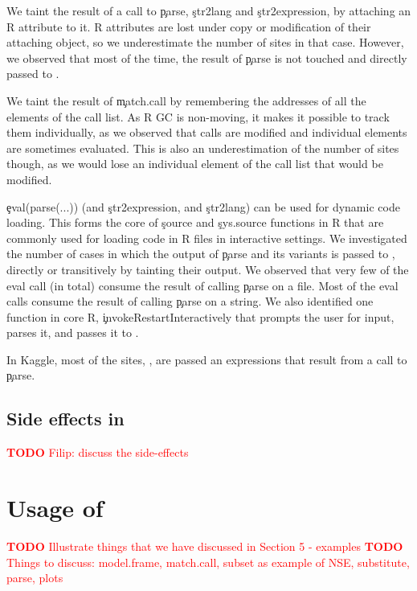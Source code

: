 \documentclass[screen,acmsmall]{acmart}
\newcommand{\authorcomment}[3]{\xspace\textcolor{#1}{{\bf #2} #3}\xspace}
\newcommand{\todo}[1]{\authorcomment{red}{TODO}{#1}}
\begin{document}
We taint the result of a call to \c{parse}, \c{str2lang} and \c{str2expression}, by attaching an R attribute to it. R attributes are lost under copy or modification of their attaching object, so we underestimate the number of sites in that case. However, we observed that most of the time, the result of \c{parse} is not touched and directly passed to \eval.

We taint the result of \c{match.call} by remembering the addresses of all the elements of the call list. As R GC is non-moving, it makes it possible to track them individually, as we observed that calls are modified and individual elements are sometimes evaluated. This is also an underestimation of the number of sites though, as we would lose an individual element of the call list that would be modified.




\c{eval(parse(...))} (and \c{str2expression}, and \c{str2lang}) can be used for dynamic code loading. This forms
the core of \c{source} and \c{sys.source} functions in R that are
commonly used for loading code in R files in interactive settings. We
investigated the number of cases in which the output of \c{parse} and
its variants is passed to \eval, directly or transitively by tainting
their output.  We observed that very few of the eval call (\packageNbParseFromFileSites in total)
consume the result of calling \c{parse} on a file. Most of the eval
calls consume the result of calling \c{parse} on a string. We also
identified one function in core R, \c{invokeRestartInteractively} that
prompts the user for input, parses it, and passes it to \eval.

In Kaggle, most of the sites, \ie \kaggleParseExprsSitePercent, are passed  an expressions that result from a call to \c{parse}.

\subsection{Side effects in \eval}

\todo{Filip: discuss the side-effects}

\section{Usage of \eval}

\todo{Illustrate things that we have discussed in Section 5 - examples}
\todo{Things to discuss: model.frame, match.call, subset as example of NSE, substitute, parse, plots}
\end{document}
